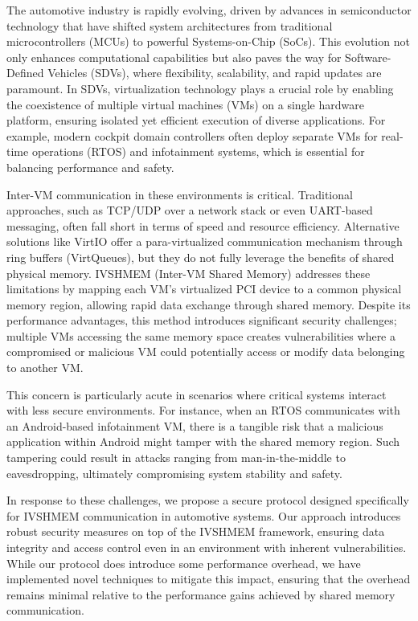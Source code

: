 \documentclass[letterpaper,twocolumn,10pt]{article}
\begin{document}
The automotive industry is rapidly evolving, driven by advances in semiconductor technology that have shifted system architectures from traditional microcontrollers (MCUs) to powerful Systems-on-Chip (SoCs). This evolution not only enhances computational capabilities but also paves the way for Software-Defined Vehicles (SDVs), where flexibility, scalability, and rapid updates are paramount. In SDVs, virtualization technology plays a crucial role by enabling the coexistence of multiple virtual machines (VMs) on a single hardware platform, ensuring isolated yet efficient execution of diverse applications. For example, modern cockpit domain controllers often deploy separate VMs for real-time operations (RTOS) and infotainment systems, which is essential for balancing performance and safety.

Inter-VM communication in these environments is critical. Traditional approaches, such as TCP/UDP over a network stack or even UART-based messaging, often fall short in terms of speed and resource efficiency. Alternative solutions like VirtIO offer a para-virtualized communication mechanism through ring buffers (VirtQueues), but they do not fully leverage the benefits of shared physical memory. IVSHMEM (Inter-VM Shared Memory) addresses these limitations by mapping each VM's virtualized PCI device to a common physical memory region, allowing rapid data exchange through shared memory. Despite its performance advantages, this method introduces significant security challenges; multiple VMs accessing the same memory space creates vulnerabilities where a compromised or malicious VM could potentially access or modify data belonging to another VM.

This concern is particularly acute in scenarios where critical systems interact with less secure environments. For instance, when an RTOS communicates with an Android-based infotainment VM, there is a tangible risk that a malicious application within Android might tamper with the shared memory region. Such tampering could result in attacks ranging from man-in-the-middle to eavesdropping, ultimately compromising system stability and safety.

In response to these challenges, we propose a secure protocol designed specifically for IVSHMEM communication in automotive systems. Our approach introduces robust security measures on top of the IVSHMEM framework, ensuring data integrity and access control even in an environment with inherent vulnerabilities. While our protocol does introduce some performance overhead, we have implemented novel techniques to mitigate this impact, ensuring that the overhead remains minimal relative to the performance gains achieved by shared memory communication.
\end{document}
